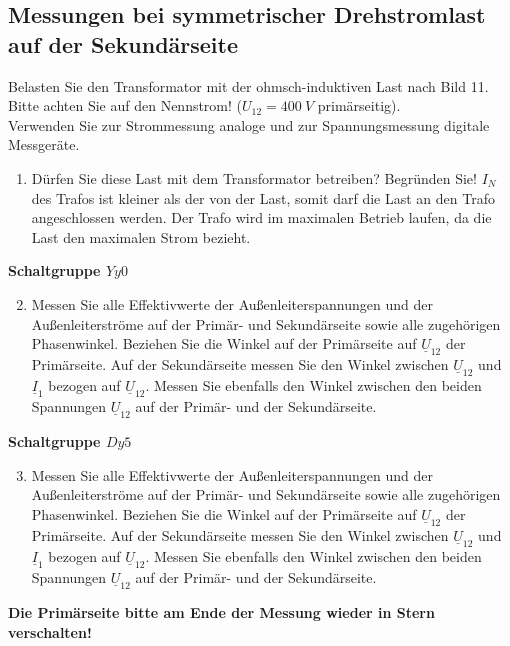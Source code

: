 \subsection{Messungen bei symmetrischer Drehstromlast auf der Sekundärseite }
Belasten Sie den Transformator mit der ohmsch-induktiven Last nach Bild 11.\\
Bitte achten Sie auf den Nennstrom! ($U_{12} = 400\ V$ primärseitig). \\
Verwenden Sie zur Strommessung analoge und zur Spannungsmessung digitale Messgeräte.  
\begin{enumerate}[label=\alph*)]
  \item Dürfen Sie diese Last mit dem Transformator betreiben? Begründen Sie!
  $I_N$ des Trafos ist kleiner als der von der Last, somit darf die Last an den Trafo  angeschlossen werden. Der Trafo wird im maximalen Betrieb laufen, da die Last den maximalen Strom bezieht.
\end{enumerate}
\textbf{Schaltgruppe $Yy0$}
\begin{enumerate}[label=\alph*)]
  \setcounter{enumi}{1}
  \item Messen Sie alle Effektivwerte der Außenleiterspannungen und der Außenleiterströme auf der Primär- und Sekundärseite sowie alle zugehörigen Phasenwinkel. Beziehen Sie die Winkel auf der Primärseite auf $\underline U_{12}$ der Primärseite. Auf der Sekundärseite messen Sie den Winkel zwischen $\underline U_{12}$ und $\underline I_1$ bezogen auf $\underline U_{12}$. Messen Sie ebenfalls den Winkel zwischen den beiden Spannungen $\underline U_{12}$ auf der Primär- und der Sekundärseite. 
\end{enumerate}
\textbf{Schaltgruppe $Dy5$}
\begin{enumerate}[label=\alph*)]
  \setcounter{enumi}{2}
  \item Messen Sie alle Effektivwerte der Außenleiterspannungen und der Außenleiterströme auf der Primär- und Sekundärseite sowie alle zugehörigen Phasenwinkel. Beziehen Sie die Winkel auf der Primärseite auf $\underline U_{12}$ der Primärseite. Auf der Sekundärseite messen Sie den Winkel zwischen $\underline U_{12}$ und $\underline I_1$ bezogen auf $\underline U_{12}$. Messen Sie ebenfalls den Winkel zwischen den beiden Spannungen $\underline U_{12}$ auf der Primär- und der Sekundärseite. 
\end{enumerate}
\textbf{Die Primärseite bitte am Ende der Messung wieder in Stern verschalten! }
